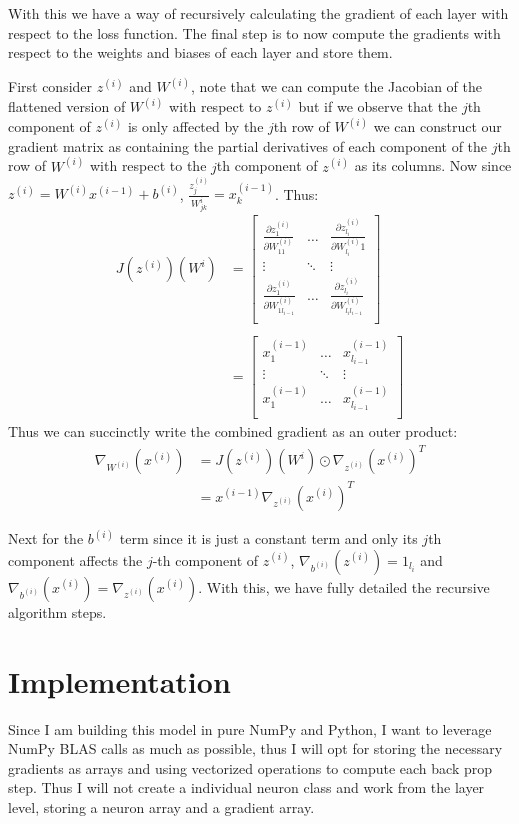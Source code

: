 \documentclass[12pt]{article}
\begin{document}
With this we have a way of recursively calculating the gradient of each layer
with respect to the loss function. The final step is to now compute the gradients with
respect to the weights and biases of each layer and store them.



First consider $z^{(i)}$ and $W^{(i)}$, note that we can compute the Jacobian of the
flattened version of $W^{(i)}$ with respect to $z^{(i)}$ but if we observe that
the $j$th component of $z^{(i)}$ is only affected by the $j$th row of $W^{(i)}$
we can construct our gradient matrix as containing the partial derivatives of each component of the
$j$th row of $W^{(i)}$ with respect to the $j$th component of $z^{(i)}$ as its columns. Now since
$z^{(i)} = W^{(i)}x^{(i-1)} + b^{(i)}$, $\frac{z^{(i)}_j}{W^{i}_{jk}} = x^{(i-1)}_k$. Thus:
\begin{align*}
    J(z^{(i)})(W^{i}) &= \begin{bmatrix}
        \frac{\partial z^{(i)}_1}{\partial W^{(i)}_{11}} & \ldots  & \frac{\partial z^{(i)}_{l_i}}{\partial W^{(i)}_{l_i}1} \\
        \vdots & \ddots & \vdots \\
        \frac{\partial z^{(i)}_1}{\partial W^{(i)}_{1l_{i-1}}} & \ldots  & \frac{\partial z^{(i)}_{l_i}}{\partial W^{(i)}_{l_il_{i-1}}} \\
    \end{bmatrix} \\ \\
    &= \begin{bmatrix}
        x^{(i-1)}_1 & \ldots  & x^{(i-1)}_{l_{i-1}} \\
        \vdots & \ddots & \vdots \\
       x^{(i-1)}_1 & \ldots  & x^{(i-1)}_{l_{i-1}} \\
    \end{bmatrix}
\end{align*}
Thus we can succinctly write the combined gradient as an outer product:
\begin{align*}
    \nabla_{W^{(i)}}(x^{(i)}) &=  J(z^{(i)})(W^{i}) \odot \nabla_{z^{(i)}}(x^{(i)})^T \\
    &= x^{(i-1)}\nabla_{z^{(i)}}(x^{(i)})^T
\end{align*}
 
Next for the $b^{(i)}$ term since it is just a constant term and only its $j$th component affects
the $j$-th component of $z^{(i)}$, $\nabla_{b^{(i)}}(z^{(i)}) = 1_{l_i}$ and
$\nabla_{b^{(i)}}(x^{(i)}) = \nabla_{z^{(i)}}(x^{(i)})$. With this, we have
fully detailed the recursive algorithm steps.

\section*{Implementation}
Since I am building this model in pure NumPy and Python, I want to leverage
NumPy BLAS calls as much as possible, thus I will opt for storing the necessary gradients
as arrays and using vectorized operations to compute each back prop step. Thus
I will not create a individual neuron class and work from the layer level, storing a neuron
array and a gradient array.
\end{document}
